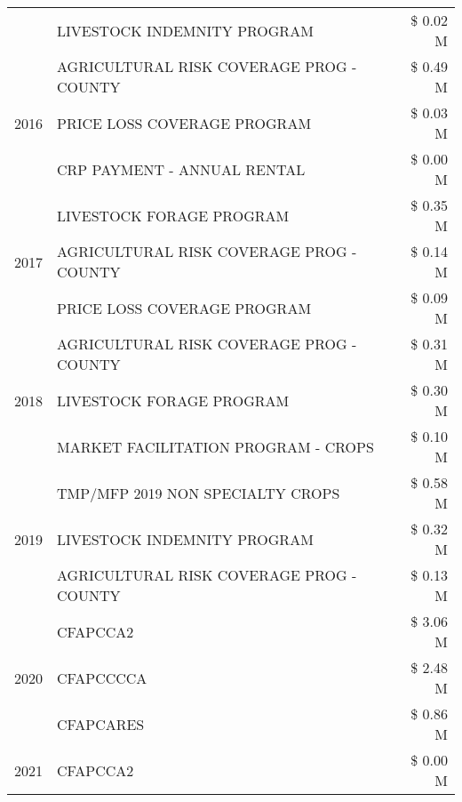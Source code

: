 \begin{tabular}{llr}
 & LIVESTOCK INDEMNITY PROGRAM & \$ 0.02 M \\
\cline{1-3}
\multirow[t]{3}{*}{2016} & AGRICULTURAL RISK COVERAGE PROG - COUNTY & \$ 0.49 M \\
 & PRICE LOSS COVERAGE PROGRAM & \$ 0.03 M \\
 & CRP PAYMENT - ANNUAL RENTAL & \$ 0.00 M \\
\cline{1-3}
\multirow[t]{3}{*}{2017} & LIVESTOCK FORAGE PROGRAM & \$ 0.35 M \\
 & AGRICULTURAL RISK COVERAGE PROG - COUNTY & \$ 0.14 M \\
 & PRICE LOSS COVERAGE PROGRAM & \$ 0.09 M \\
\cline{1-3}
\multirow[t]{3}{*}{2018} & AGRICULTURAL RISK COVERAGE PROG - COUNTY & \$ 0.31 M \\
 & LIVESTOCK FORAGE PROGRAM & \$ 0.30 M \\
 & MARKET FACILITATION PROGRAM - CROPS & \$ 0.10 M \\
\cline{1-3}
\multirow[t]{3}{*}{2019} & TMP/MFP 2019 NON SPECIALTY CROPS & \$ 0.58 M \\
 & LIVESTOCK INDEMNITY PROGRAM & \$ 0.32 M \\
 & AGRICULTURAL RISK COVERAGE PROG - COUNTY & \$ 0.13 M \\
\cline{1-3}
\multirow[t]{3}{*}{2020} & CFAPCCA2 & \$ 3.06 M \\
 & CFAPCCCCA & \$ 2.48 M \\
 & CFAPCARES & \$ 0.86 M \\
\cline{1-3}
2021 & CFAPCCA2 & \$ 0.00 M \\
\cline{1-3}
\bottomrule
\end{tabular}
